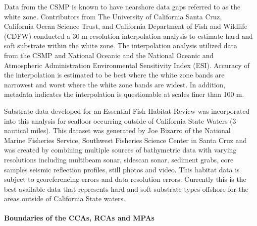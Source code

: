 \documentclass[11pt,
  english,
  a4paper,
]{article}
\begin{document}
\leavevmode\tagmcend\tagstructend\par


Data from the CSMP is known to have nearshore data gaps referred to as the white zone. Contributors from The University of California Santa Cruz, California Ocean Science Trust, and California Department of Fish and Wildlife (CDFW) conducted a 30 m resolution interpolation analysis to estimate hard and soft substrate within the white zone. The interpolation analysis utilized data from the CSMP and National Oceanic and the National Oceanic and Atmospheric Administration Environmental Sensitivity Index (ESI). Accuracy of the interpolation is estimated to be best where the white zone bands are narrowest and worst where the white zone bands are widest. In addition, metadata indicates the interpolation is questionable at scales finer than 100 m.

\leavevmode\tagmcend\tagstructend\par


Substrate data developed for an Essential Fish Habitat Review was incorporated into this analysis for seafloor occurring outside of California State Waters (3 nautical miles). This dataset was generated by Joe Bizarro of the National Marine Fisheries Service, Southwest Fisheries Science Center in Santa Cruz and was created by combining multiple sources of bathymetric data with varying resolutions including multibeam sonar, sidescan sonar, sediment grabs, core samples seismic reflection profiles, still photos and video. This habitat data is subject to georeferencing errors and data resolution errors. Currently this is the best available data that represents hard and soft substrate types offshore for the areas outside of California State waters.

\leavevmode\tagmcend\tagstructend\par


\hypertarget{boundaries-of-the-ccas-rcas-and-mpas}{%
\paragraph{Boundaries of the CCAs, RCAs and MPAs}\label{boundaries-of-the-ccas-rcas-and-mpas}}

\leavevmode\tagmcend\tagstructend
\end{document}

